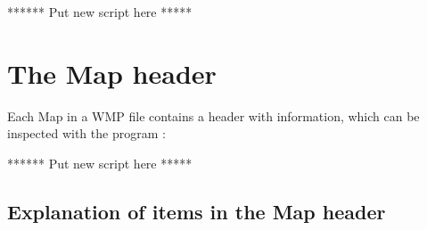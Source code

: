 ****** Put new script here ***** 


\section{The Map header} 
\label{.map.header} 

Each Map in a WMP file contains a header with information, which can be
inspected with the program : 


****** Put new script here ***** 



\subsection{Explanation of items in the Map header} 
\label{.header.items} 


